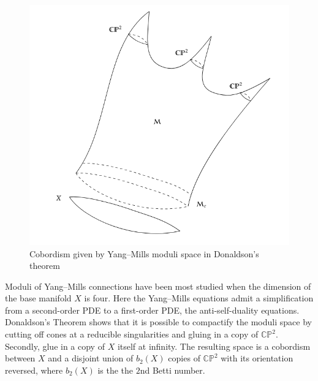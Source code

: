 \documentclass{article}
\begin{document}
    \begin{figure}
        \vspace{-1.2cm}
        \centering
        \includegraphics[scale=0.2]{Donaldson's_Theorem_cobordism.png}
        \\ Cobordism given by Yang–Mills moduli space in Donaldson's theorem
    \end{figure}
    
    
    
    Moduli of Yang–Mills connections have been most studied when the dimension of the base manifold $X$ is four. Here the Yang–Mills equations admit a simplification from a second-order PDE to a first-order PDE, the anti-self-duality equations. 
    Donaldson's Theorem shows that it is possible to compactify the moduli space by cutting off cones at a reducible singularities and gluing in a copy of ${\displaystyle \mathbb {CP} ^{2}}$. Secondly, glue in a copy of $X$ itself at infinity. The resulting space is a cobordism between $X$ and a disjoint union of ${\displaystyle b_{2}(X)}$ copies of ${\displaystyle \mathbb {CP} ^{2}}$ with its orientation reversed, where $b_{2}(X)$ is the the $2$nd Betti number.
    
\end{document}
